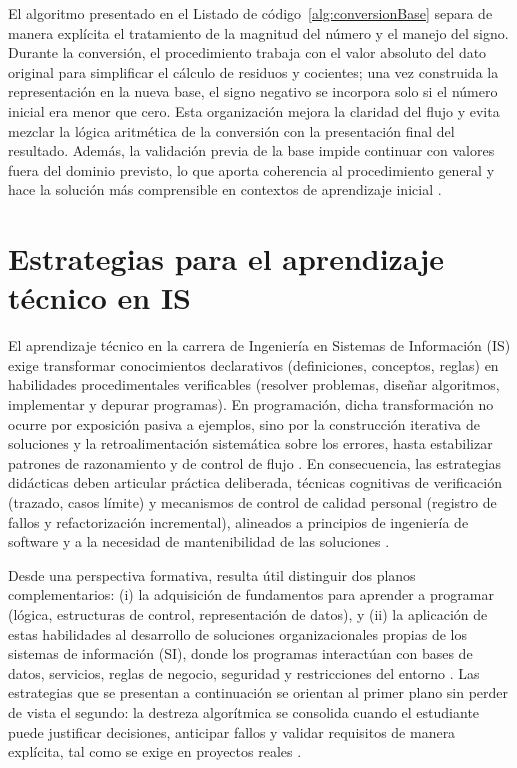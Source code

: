 \documentclass[12pt,twoside]{book}
\begin{document}
					\noindent
					El algoritmo presentado en el Listado de código~\ref{alg:conversionBase} separa de manera explícita el tratamiento de la magnitud del número y el manejo del signo. Durante la conversión, el procedimiento trabaja con el valor absoluto del dato original para simplificar el cálculo de residuos y cocientes; una vez construida la representación en la nueva base, el signo negativo se incorpora solo si el número inicial era menor que cero. Esta organización mejora la claridad del flujo y evita mezclar la lógica aritmética de la conversión con la presentación final del resultado. Además, la validación previa de la base impide continuar con valores fuera del dominio previsto, lo que aporta coherencia al procedimiento general y hace la solución más comprensible en contextos de aprendizaje inicial \cite{Gaddis2022Starting,Farrell2018Programming,Pressman2019Software,Sommerville2015Software}.
			
			\section{Estrategias para el aprendizaje técnico en IS}
				\noindent
				El aprendizaje técnico en la carrera de Ingeniería en Sistemas de Información (IS) exige transformar conocimientos declarativos (definiciones, conceptos, reglas) en habilidades procedimentales verificables (resolver problemas, diseñar algoritmos, implementar y depurar programas). En programación, dicha transformación no ocurre por exposición pasiva a ejemplos, sino por la construcción iterativa de soluciones y la retroalimentación sistemática sobre los errores, hasta estabilizar patrones de razonamiento y de control de flujo \cite{Gaddis2022Starting,Farrell2018Programming,SWEBOK2025Guide}. En consecuencia, las estrategias didácticas deben articular práctica deliberada, técnicas cognitivas de verificación (trazado, casos límite) y mecanismos de control de calidad personal (registro de fallos y refactorización incremental), alineados a principios de ingeniería de software y a la necesidad de mantenibilidad de las soluciones \cite{Pressman2019Software,Sommerville2015Software,Abid2020Years}.
				
				Desde una perspectiva formativa, resulta útil distinguir dos planos complementarios: (i) la adquisición de fundamentos para aprender a programar (lógica, estructuras de control, representación de datos), y (ii) la aplicación de estas habilidades al desarrollo de soluciones organizacionales propias de los sistemas de información (SI), donde los programas interactúan con bases de datos, servicios, reglas de negocio, seguridad y restricciones del entorno \cite{Laudon2020Management,Kendall2014Systems,ISOIECIEEE2018Requirements}. Las estrategias que se presentan a continuación se orientan al primer plano sin perder de vista el segundo: la destreza algorítmica se consolida cuando el estudiante puede justificar decisiones, anticipar fallos y validar requisitos de manera explícita, tal como se exige en proyectos reales \cite{SWEBOK2025Guide,ISOIECIEEE2018Requirements,Pressman2019Software}.
				
\end{document}
